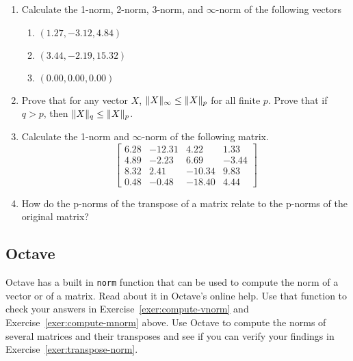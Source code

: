 \begin{enumerate}

\item \label{exer:compute-vnorm} Calculate the 1-norm, 2-norm, 3-norm, and $\infty$-norm of the
  following vectors

\begin{enumerate}
  \item $(1.27, -3.12, 4.84)$
  \item $(3.44, -2.19, 15.32)$
  \item $(0.00, 0.00, 0.00)$
\end{enumerate}

\item Prove that for any vector $X$, $\|X\|_\infty \le \|X\|_p$ for all finite $p$. Prove
  that if $q > p$, then $\|X\|_q \le \|X\|_p$.

\item \label{exer:compute-mnorm} Calculate the 1-norm and $\infty$-norm of the following matrix.
\begin{displaymath}
\left[
\begin{array}{rrrr}
6.28 & -12.31 &   4.22 &  1.33 \\
4.89 &  -2.23 &   6.69 & -3.44 \\
8.32 &   2.41 & -10.34 &  9.83 \\
0.48 &  -0.48 & -18.40 &  4.44
\end{array}
\right]
\end{displaymath}

\item \label{exer:transpose-norm} How do the p-norms of the transpose of a matrix relate to the
  p-norms of the original matrix?

\end{enumerate}

\subsection*{Octave}

Octave has a built in \texttt{norm} function that can be used to compute the norm of a vector or
of a matrix. Read about it in Octave's online help. Use that function to check your answers in
Exercise~\ref{exer:compute-vnorm} and Exercise~\ref{exer:compute-mnorm} above. Use Octave to
compute the norms of several matrices and their transposes and see if you can verify your
findings in Exercise~\ref{exer:transpose-norm}.
